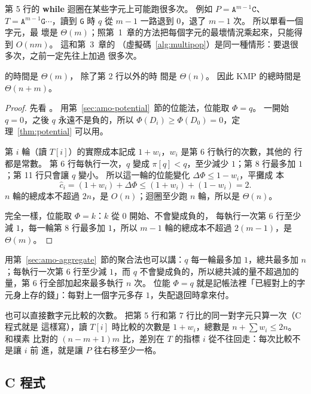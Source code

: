 第 5 行的 \textbf{while} 迴圈在某些字元上可能跑很多次。 例如
$P = \mathtt{A}^{m-1}\mathtt{C}$、$T = \mathtt{A}^{m-1}\mathtt{G}\cdots$，讀到
\texttt{G} 時 $q$ 從 $m - 1$ 一路退到 $0$，退了 $m - 1$ 次。 所以單看一個字元，最
壞是 $\Theta(m)$；照第~1~章的方法把每個字元的最壞情況乘起來，只能得到
$O(nm)$。 這和第~3~章的 （虛擬碼~\ref{alg:multipop}）是同一種情形：要退很多次，之前一定先往上加過
很多次。

\begin{theorem}
\label{thm:stm-kmp-time}
 的時間是 $\Theta(m)$， 除了第 2 行以外的時
間是 $\Theta(n)$。 因此 KMP 的總時間是 $\Theta(n + m)$。
\end{theorem}

\begin{proof}
先看 。 用第~\ref{sec:amo-potential}~節的位能法，位能取
$\Phi = q$。 一開始 $q = 0$，之後 $q$ 永遠不是負的，所以
$\Phi(D_i) \ge \Phi(D_0) = 0$，定理~\ref{thm:potential} 可以用。

第 $i$ 輪（讀 $T[i]$）的實際成本記成 $1 + w_i$，$w_i$ 是第 6 行執行的次數，其他的
行都是常數。 第 6 行每執行一次，$q$ 變成 $\pi[q] < q$，至少減少 $1$；第 8 行最多加
$1$；第 11 行只會讓 $q$ 變小。 所以這一輪的位能變化 $\Delta\Phi \le 1 - w_i$，平攤成
本
\[
\hat{c}_i = (1 + w_i) + \Delta\Phi \le (1 + w_i) + (1 - w_i) = 2.
\]
$n$ 輪的總成本不超過 $2n$，是 $O(n)$；迴圈至少跑 $n$ 輪，所以是 $\Theta(n)$。

 完全一樣，位能取 $\Phi = k$：$k$ 從 $0$ 開始、不會變成負的，
每執行一次第 6 行至少減 $1$，每一輪第 8 行最多加 $1$，所以 $m - 1$ 輪的總成本不超過
$2(m - 1)$，是 $\Theta(m)$。
\end{proof}

用第~\ref{sec:amo-aggregate}~節的聚合法也可以講：$q$ 每一輪最多加 $1$，總共最多加
$n$；每執行一次第 6 行至少減 $1$，而 $q$ 不會變成負的，所以總共減的量不超過加的
量，第 6 行全部加起來最多執行 $n$ 次。 位能 $\Phi = q$ 就是記帳法裡「已經對上的字
元身上存的錢」：每對上一個字元多存 $1$，失配退回時拿來付。

也可以直接數字元比較的次數。 把第 5 行和第 7 行比的同一對字元只算一次（C 程式就是
這樣寫），讀 $T[i]$ 時比較的次數是 $1 + w_i$，總數是 $n + \sum w_i \le 2n$。 和樸素
比對的 $(n - m + 1)m$ 比，差別在 $T$ 的指標 $i$ 從不往回走：每次比較不是讓 $i$ 前
進，就是讓 $P$ 往右移至少一格。

\subsection{C 程式}

